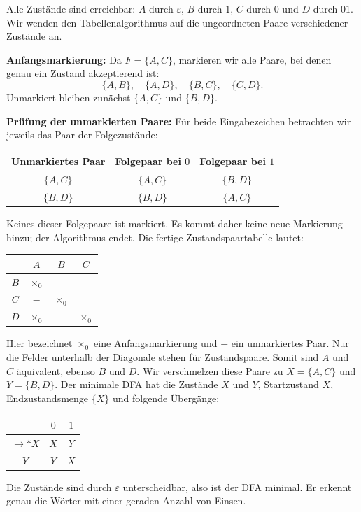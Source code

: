 \begin{loesung}

Alle Zustände sind erreichbar: $A$ durch $\varepsilon$, $B$ durch $1$,
$C$ durch $0$ und $D$ durch $01$.
Wir wenden den Tabellenalgorithmus auf die ungeordneten Paare verschiedener
Zustände an.

\textbf{Anfangsmarkierung:} Da $F=\{A,C\}$, markieren wir alle Paare,
bei denen genau ein Zustand akzeptierend ist:
\[
\{A,B\},\quad \{A,D\},\quad \{B,C\},\quad \{C,D\}.
\]
Unmarkiert bleiben zunächst $\{A,C\}$ und $\{B,D\}$.

\textbf{Prüfung der unmarkierten Paare:} Für beide Eingabezeichen betrachten
wir jeweils das Paar der Folgezustände:
\begin{center}
\begin{tabular}{c|cc}
Unmarkiertes Paar & Folgepaar bei $0$ & Folgepaar bei $1$\\\hline
$\{A,C\}$ & $\{A,C\}$ & $\{B,D\}$\\
$\{B,D\}$ & $\{B,D\}$ & $\{A,C\}$
\end{tabular}
\end{center}
Keines dieser Folgepaare ist markiert. Es kommt daher keine neue Markierung
hinzu; der Algorithmus endet. Die fertige Zustandspaartabelle lautet:
\begin{center}
\begin{tabular}{c|ccc}
 & $A$ & $B$ & $C$\\\hline
$B$ & $\times_0$ & &\\
$C$ & $-$ & $\times_0$ &\\
$D$ & $\times_0$ & $-$ & $\times_0$
\end{tabular}
\end{center}
Hier bezeichnet $\times_0$ eine Anfangsmarkierung und $-$ ein unmarkiertes
Paar. Nur die Felder unterhalb der Diagonale stehen für Zustandspaare.
Somit sind $A$ und $C$ äquivalent, ebenso $B$ und $D$.
Wir verschmelzen diese Paare zu $X=\{A,C\}$ und $Y=\{B,D\}$.
Der minimale DFA hat die Zustände $X$ und $Y$,
Startzustand $X$, Endzustandsmenge $\{X\}$ und folgende Übergänge:
\begin{center}
\begin{tabular}{c|cc}
 & $0$ & $1$\\\hline
$\to *X$ & $X$ & $Y$\\
$Y$ & $Y$ & $X$
\end{tabular}
\end{center}
Die Zustände sind durch $\varepsilon$ unterscheidbar, also ist der DFA minimal.
Er erkennt genau die Wörter mit einer geraden Anzahl von Einsen.
\end{loesung}

